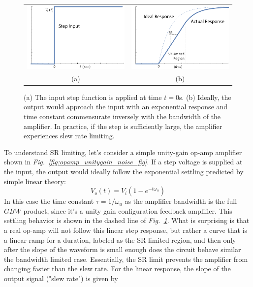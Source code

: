 \begin{figure}[tb]
\centering
\begin{tabular}{cc}
\includegraphics[width=.45\columnwidth]{step_input} &
\includegraphics[width=.45\columnwidth]{exp_slew}\\
(a) & (b)\\
\end{tabular}
\caption{(a) The input step function is applied at time $t=0$s.  (b) Ideally, the output would approach the input with an exponential response and time constant commensurate inversely with the bandwidth of the amplifier. In practice, if the step is sufficiently large, the amplifier experiences slew rate limiting.}
\label{fig:step_input}
\end{figure}
To understand SR limiting, let's consider a simple unity-gain op-amp amplifier shown in \emph{Fig.~\ref{fig:opamp_unitygain_noise_fig}}.  If a step voltage is supplied at the input, the output would ideally  follow the exponential settling predicted by simple linear theory:
    \begin{equation}
        V_o(t) = V_i \left( 1 - e^{-t \omega_u} \right) 
    \end{equation}
In this case the time constant $\tau = 1/\omega_u$ as the amplifier bandwidth is the full $GBW$ product, since it's a unity gain configuration feedback amplifier.  This settling behavior is shown in the dashed line of \emph{Fig.~\ref{fig:step_input}}.  What is surprising is that a real op-amp will not follow this linear step response, but rather a curve that is a linear ramp for a duration, labeled as the SR limited region, and then only after the slope of the waveform is small enough does the circuit behave similar the bandwidth limited case.  Essentially, the SR limit prevents the amplifier from changing faster than the slew rate.  For the linear response, the  slope of the output signal ("slew rate") is given by
